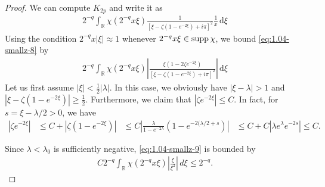 \documentclass[../dissertation.tex]{subfiles}
\begin{document}
\begin{proof}
	We can compute $K_{2p}$ and write it as
	\begin{align}\label{eq:1.04-smallz-8}
		2^{-q} 
		\int_{\mathbb R} 
			\chi\left( 2^{-q} x \xi \right)
			\frac{1}{\left[\xi - \zeta\left(1-e^{-2\xi}\right) + i \pi \right]^2}
			\frac{1}{x}
		\, \mathrm{d}\xi
	\end{align}
	Using the condition $2^{-q} x |\xi| \approx 1$ whenever $2^{-q} x \xi \in \operatorname{supp} \chi$, 
	we bound \eqref{eq:1.04-smallz-8} by 
	\begin{align}\label{eq:1.04-smallz-9}
		2^{-q} 
		\int_{\mathbb R} \chi\left( 2^{-q} x \xi \right) 
			\left|
				\frac{\xi(1 - 2 \zeta e^{-2\xi})} {\left[\xi - \zeta\left(1-e^{-2\xi}\right) + i \pi \right]^2}
			\right|
		\, \mathrm{d}\xi
	\end{align}
	Let us first assume $\displaystyle |\xi| < \frac{1}{2}|\lambda|$. In this case, we obviously have 
	$|\xi - \lambda| > 1$ and 
	$\displaystyle \left| \xi - \zeta\left(1-e^{-2\xi}\right) \right| \geq \frac{1}{2}$. 
	Furthermore, we claim that $\left|\zeta e^{-2\xi}\right| \leq C$. In fact, for 
	$s = \xi - \lambda/2 > 0$, we have
	\begin{align*}
		\left| \zeta e^{-2\xi} \right|
			&\leq C + \left| \zeta\left(1 - e^{-2\xi}\right) \right|
			&\leq C 
				\left| 
					\frac{\lambda}
						{1-e^{-2\lambda}}\left(1 - e^{-2(\lambda/2+s}\right) 
				\right|
			&\leq C + C\left|\lambda e^{\lambda} e^{-2s}\right|
			\leq C.
	\end{align*}

	Since $\lambda < \lambda_0$ is suf{}ficiently negative, \eqref{eq:1.04-smallz-9}
	is bounded by 
	\begin{align}\label{eq:1.04-smallz-10}
		C 2^{-q} 
		\int_{\mathbb R} 
			\chi\left(2^{-q} x \xi\right) \left|\frac{\xi}{\xi^2}\right| 
		\,d\xi
		\leq 2^{-q}.
	\end{align}


\end{proof}
\end{document}
